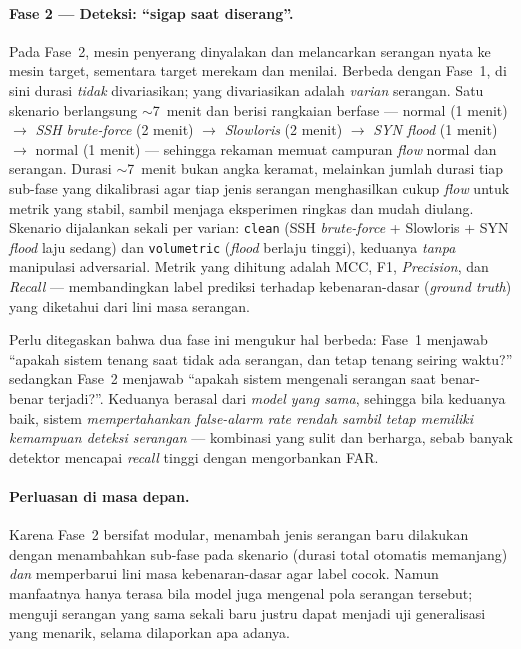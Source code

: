 \documentclass[11pt,a4paper]{article}
\begin{document}
\paragraph{Fase 2 --- Deteksi: ``sigap saat diserang''.}
Pada Fase~2, mesin penyerang dinyalakan dan melancarkan serangan nyata ke mesin
target, sementara target merekam dan menilai. Berbeda dengan Fase~1, di sini
durasi \emph{tidak} divariasikan; yang divariasikan adalah \emph{varian}
serangan. Satu skenario berlangsung $\sim$7~menit dan berisi rangkaian berfase
--- normal (1 menit) $\rightarrow$ \emph{SSH brute-force} (2 menit) $\rightarrow$
\emph{Slowloris} (2 menit) $\rightarrow$ \emph{SYN flood} (1 menit) $\rightarrow$
normal (1 menit) --- sehingga rekaman memuat campuran \emph{flow} normal dan
serangan. Durasi $\sim$7~menit bukan angka keramat, melainkan jumlah durasi tiap
sub-fase yang dikalibrasi agar tiap jenis serangan menghasilkan cukup \emph{flow}
untuk metrik yang stabil, sambil menjaga eksperimen ringkas dan mudah diulang.
Skenario dijalankan sekali per varian: \texttt{clean} (SSH \emph{brute-force} +
Slowloris + SYN \emph{flood} laju sedang) dan \texttt{volumetric} (\emph{flood}
berlaju tinggi), keduanya \emph{tanpa} manipulasi adversarial. Metrik yang dihitung
adalah MCC, F1, \emph{Precision}, dan \emph{Recall}
--- membandingkan label prediksi terhadap kebenaran-dasar (\emph{ground truth})
yang diketahui dari lini masa serangan.

Perlu ditegaskan bahwa dua fase ini mengukur hal berbeda: Fase~1 menjawab
``apakah sistem tenang saat tidak ada serangan, dan tetap tenang seiring waktu?''
sedangkan Fase~2 menjawab ``apakah sistem mengenali serangan saat benar-benar
terjadi?''. Keduanya berasal dari \emph{model yang sama},
sehingga bila keduanya baik, sistem \emph{mempertahankan \emph{false-alarm rate}
rendah sambil tetap memiliki kemampuan deteksi serangan} --- kombinasi yang sulit
dan berharga, sebab banyak detektor mencapai \emph{recall} tinggi dengan
mengorbankan FAR.

\paragraph{Perluasan di masa depan.} Karena Fase~2 bersifat modular, menambah
jenis serangan baru dilakukan dengan menambahkan sub-fase pada skenario (durasi
total otomatis memanjang) \emph{dan} memperbarui lini masa kebenaran-dasar agar
label cocok. Namun manfaatnya hanya terasa bila model juga mengenal pola serangan
tersebut; menguji serangan yang sama sekali baru justru dapat menjadi uji
generalisasi yang menarik, selama dilaporkan apa adanya.
\end{document}
